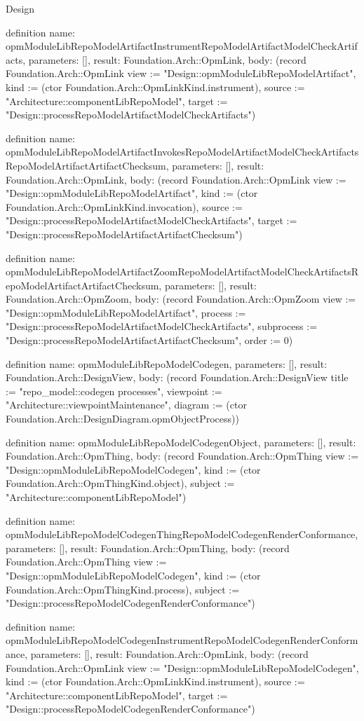 \begin{lexlean}{Design}
\begin{semanticmodule}
definition{
  name: opmModuleLibRepoModelArtifactInstrumentRepoModelArtifactModelCheckArtifacts,
  parameters: [],
  result: Foundation.Arch::OpmLink,
  body: (record Foundation.Arch::OpmLink {view := "Design::opmModuleLibRepoModelArtifact", kind := (ctor Foundation.Arch::OpmLinkKind.instrument), source := "Architecture::componentLibRepoModel", target := "Design::processRepoModelArtifactModelCheckArtifacts"})
}

definition{
  name: opmModuleLibRepoModelArtifactInvokesRepoModelArtifactModelCheckArtifactsRepoModelArtifactArtifactChecksum,
  parameters: [],
  result: Foundation.Arch::OpmLink,
  body: (record Foundation.Arch::OpmLink {view := "Design::opmModuleLibRepoModelArtifact", kind := (ctor Foundation.Arch::OpmLinkKind.invocation), source := "Design::processRepoModelArtifactModelCheckArtifacts", target := "Design::processRepoModelArtifactArtifactChecksum"})
}

definition{
  name: opmModuleLibRepoModelArtifactZoomRepoModelArtifactModelCheckArtifactsRepoModelArtifactArtifactChecksum,
  parameters: [],
  result: Foundation.Arch::OpmZoom,
  body: (record Foundation.Arch::OpmZoom {view := "Design::opmModuleLibRepoModelArtifact", process := "Design::processRepoModelArtifactModelCheckArtifacts", subprocess := "Design::processRepoModelArtifactArtifactChecksum", order := 0})
}

definition{
  name: opmModuleLibRepoModelCodegen,
  parameters: [],
  result: Foundation.Arch::DesignView,
  body: (record Foundation.Arch::DesignView {title := "repo_model::codegen processes", viewpoint := "Architecture::viewpointMaintenance", diagram := (ctor Foundation.Arch::DesignDiagram.opmObjectProcess)})
}

definition{
  name: opmModuleLibRepoModelCodegenObject,
  parameters: [],
  result: Foundation.Arch::OpmThing,
  body: (record Foundation.Arch::OpmThing {view := "Design::opmModuleLibRepoModelCodegen", kind := (ctor Foundation.Arch::OpmThingKind.object), subject := "Architecture::componentLibRepoModel"})
}

definition{
  name: opmModuleLibRepoModelCodegenThingRepoModelCodegenRenderConformance,
  parameters: [],
  result: Foundation.Arch::OpmThing,
  body: (record Foundation.Arch::OpmThing {view := "Design::opmModuleLibRepoModelCodegen", kind := (ctor Foundation.Arch::OpmThingKind.process), subject := "Design::processRepoModelCodegenRenderConformance"})
}

definition{
  name: opmModuleLibRepoModelCodegenInstrumentRepoModelCodegenRenderConformance,
  parameters: [],
  result: Foundation.Arch::OpmLink,
  body: (record Foundation.Arch::OpmLink {view := "Design::opmModuleLibRepoModelCodegen", kind := (ctor Foundation.Arch::OpmLinkKind.instrument), source := "Architecture::componentLibRepoModel", target := "Design::processRepoModelCodegenRenderConformance"})
}


\end{semanticmodule}
\end{lexlean}
